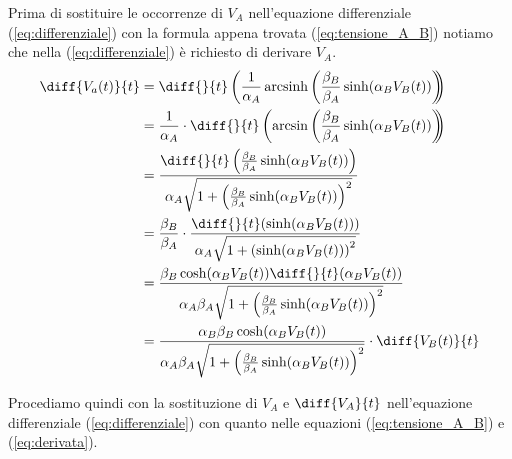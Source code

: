 	Prima di sostituire le occorrenze di $V_{A}$ nell'equazione differenziale (\ref{eq:differenziale}) con la formula appena trovata (\ref{eq:tensione_A_B}) notiamo che nella (\ref{eq:differenziale}) è richiesto di derivare $V_{A}$.
	\begin{equation}
		\label{eq:derivata}
		\begin{split}
			\diff{V_{a}(t)}{t} &= \diff{}{t}\left(\frac{1}{\alpha_{A}} \arcsinh \left(\frac{\beta_{B}}{\beta_{A}} \sinh(\alpha_{B}V_{B}(t))\right)\hspace{-5px}\right)\\
			&= \frac{1}{\alpha_{A}}\cdot\diff{}{t}\left(\arcsin\left(\frac{\beta_{B}}{\beta_{A}}\sinh(\alpha_{B}V_{B}(t))\right)\hspace{-5px}\right)\\
			&= \frac{\diff{}{t}\left(\frac{\beta_{B}}{\beta_{A}}\sinh(\alpha_{B}V_{B}(t))\right)}{\alpha_{A}\sqrt{1+\left(\frac{\beta_{B}}{\beta_{A}}\sinh(\alpha_{B}V_{B}(t))\right)^{2}}}\\
			&= \frac{\beta_{B}}{\beta_{A}}\cdot\frac{\diff{}{t}(\sinh(\alpha_{B}V_{B}(t)))}{\alpha_{A}\sqrt{1+\left(\sinh(\alpha_{B}V_{B}(t))\right)^{2}}}\\
			&= \frac{\beta_{B}\cosh(\alpha_{B}V_{B}(t))\diff{}{t}(\alpha_{B}V_{B}(t))}{\alpha_{A}\beta_{A}\sqrt{1+\left(\frac{\beta_{B}}{\beta_{A}}\sinh(\alpha_{B}V_{B}(t))\right)^{2}}}\\
			&= \frac{\alpha_{B}\beta_{B}\cosh(\alpha_{B}V_{B}(t))}{\alpha_{A}\beta_{A}\sqrt{1+\left(\frac{\beta_{B}}{\beta_{A}}\sinh(\alpha_{B}V_{B}(t))\right)^{2}}}\cdot\diff{V_{B}(t)}{t}
		\end{split}
	\end{equation}
	
	\vspace{100px}
	
	Procediamo quindi con la sostituzione di $V_{A}$ e $\diff{V_{A}}{t}$ nell'equazione differenziale (\ref{eq:differenziale}) con quanto nelle equazioni (\ref{eq:tensione_A_B}) e (\ref{eq:derivata}).
	\pagebreak
	
